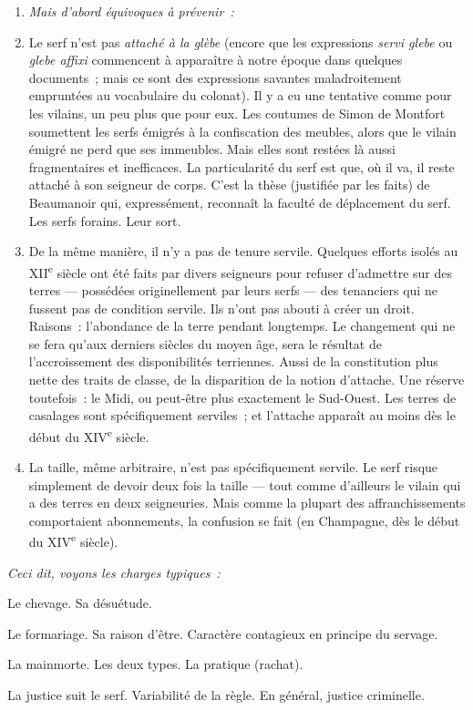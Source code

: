 \documentclass[french,twoside]{book} %
\newlength{\listmod}
\newcommand{\listhead}[1]{\hspace{-1\listmod}\emph{#1}}
\begin{document}
\begin{enumerate}[itemsep=0pt,]
\item[]\listhead{Mais d’abord équivoques à prévenir :}
\item Le serf n’est pas \emph{attaché à la glèbe} (encore que les expressions \emph{servi glebe} ou \emph{glebe affixi} commencent à apparaître à notre époque dans quelques documents ; mais ce sont des expressions savantes maladroitement empruntées au vocabulaire du colonat). Il y a eu une tentative comme pour les vilains, un peu plus que pour eux. Les coutumes de Simon de Montfort soumettent les serfs émigrés à la confiscation des meubles, alors que le vilain émigré ne perd que ses immeubles. Mais elles sont restées là aussi fragmentaires et inefficaces. La particularité du serf est que, où il va, il reste attaché à son seigneur de corps. C’est la thèse (justifiée par les faits) de Beaumanoir qui, expressément, reconnaît la faculté de déplacement du serf. Les serfs forains. Leur sort.
\item De la même manière, il n’y a pas de tenure servile. Quelques efforts isolés au XII\textsuperscript{e} siècle ont été faits par divers seigneurs pour refuser d’admettre sur des terres — possédées originellement par leurs serfs — des tenanciers qui ne fussent pas de condition servile. Ils n’ont pas abouti à créer un droit. Raisons : l’abondance de la terre pendant longtemps. Le changement qui ne se fera qu’aux derniers siècles du moyen âge, sera le résultat de l’accroissement des disponibilités terriennes. Aussi de la constitution plus nette des traits de classe, de la disparition de la notion d’attache. Une réserve toutefois : le Midi, ou peut-être plus exactement le Sud-Ouest. Les terres de casalages sont spécifiquement serviles ; et l’attache apparaît au moins dès le début du XIV\textsuperscript{e} siècle.
\item La taille, même arbitraire, n’est pas spécifiquement servile. Le serf risque simplement de devoir deux fois la taille — tout comme d’ailleurs le vilain qui a des terres en deux seigneuries. Mais comme la plupart des affranchissements comportaient abonnements, la confusion se fait (en Champagne, dès le début du XIV\textsuperscript{e} siècle).
\end{enumerate}

\label{p60}
\begin{listalpha}[itemsep=0pt,]
\item[]\listhead{Ceci dit, voyons les charges typiques :}
\item Le chevage. Sa désuétude.
\item Le formariage. Sa raison d’être. Caractère contagieux en principe du servage.
\item La mainmorte. Les deux types. La pratique (rachat).
\item La justice suit le serf. Variabilité de la règle. En général, justice criminelle.
\end{listalpha}
\end{document}
